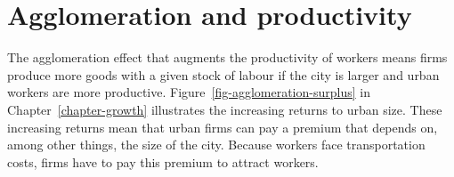 
\section{Agglomeration and productivity}\label{sec:Production-fn}


The agglomeration effect that augments the productivity of workers means firms produce more goods with a given stock of labour if the city is larger and urban workers are more productive. Figure~\ref{fig-agglomeration-surplus} in Chapter~\ref{chapter-growth} illustrates the increasing returns to urban size. %
These increasing returns mean that urban firms can %
pay a premium that depends on, among other things,  the size of the city. Because workers face transportation costs, firms have to pay this premium to attract workers. %

